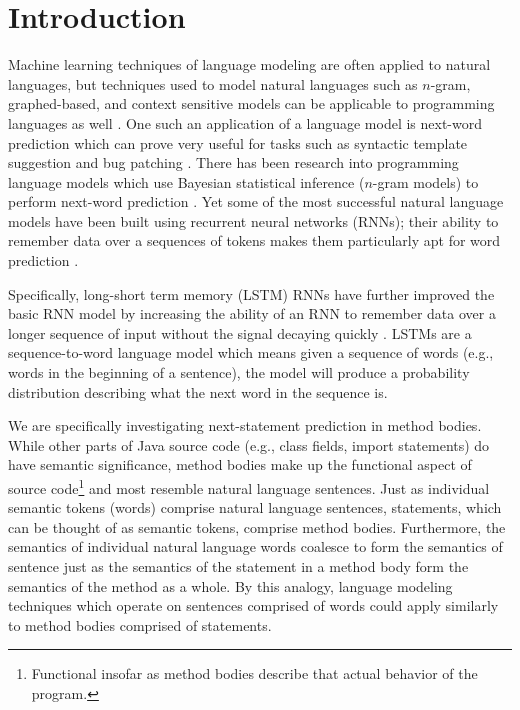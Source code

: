 \documentclass[runningheads,a4paper]{llncs}
\begin{document}
\section{Introduction}
\label{submission}

Machine learning techniques of language modeling are often applied
to natural languages, but techniques used to model natural languages
such as $n$-gram, graphed-based, and context sensitive models
can be applicable to programming languages as well
\cite{Allamanis} \cite{Nguyen} \cite{Asaduzzaman}.
One such an application of a language model is next-word prediction
which can prove very useful for tasks such as syntactic template
suggestion and bug patching
\cite{Nguyen} \cite{Kim}.
There has been research into programming language models
which use Bayesian statistical inference ($n$-gram models)
to perform next-word prediction \cite{Allamanis}.
Yet some of the most successful natural language models have been
built using recurrent neural networks (RNNs); their ability to
remember data over a sequences of tokens makes them particularly apt for
word prediction \cite{LSTMArticle}.

Specifically, long-short term memory (LSTM) RNNs have further improved
the basic RNN model by increasing the ability of an RNN to remember
data over a longer sequence of input without the signal decaying
quickly \cite{LSTMArticle}. LSTMs are a sequence-to-word language
model which means given a sequence of words (e.g., words in the
beginning of a sentence), the model will produce a probability
distribution describing what the next word in the sequence is.

We are specifically investigating next-statement prediction in method
bodies. While other parts of Java source code (e.g., class fields,
import statements) do have semantic significance, method bodies make up
the functional aspect of source code\footnote{
Functional insofar as method bodies describe that actual
behavior of the program.} and most resemble natural language sentences.
Just as individual semantic tokens (words) comprise natural language
sentences, statements, which can be thought of as semantic tokens,
comprise method bodies. Furthermore, the semantics of individual natural
language words coalesce to form the semantics of sentence just as the
semantics of the statement in a method body form the semantics of the
method as a whole. By this analogy, language modeling techniques which
operate on sentences comprised of words could apply similarly to method
bodies comprised of statements.
\end{document}
